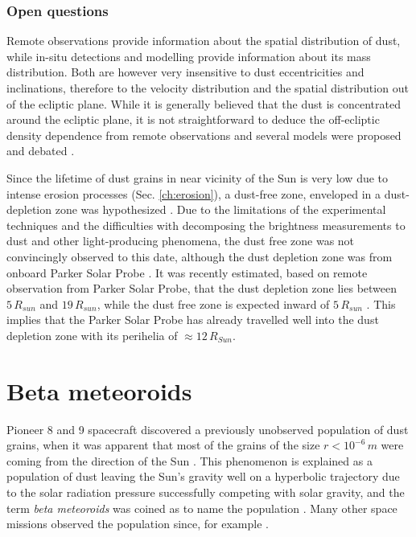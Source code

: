 \subsubsection{Open questions}

Remote observations provide information about the spatial distribution of dust, while in-situ detections and modelling provide information about its mass distribution. Both are however very insensitive to dust eccentricities and inclinations, therefore to the velocity distribution and the spatial distribution out of the ecliptic plane. While it is generally believed that the dust is concentrated around the ecliptic plane, it is not straightforward to deduce the off-ecliptic density dependence from remote observations and several models were proposed and debated \citep{giese1986three}.

Since the lifetime of dust grains in near vicinity of the Sun is very low due to intense erosion processes (Sec. \ref{ch:erosion}), a dust-free zone, enveloped in a dust-depletion zone was hypothesized \citep{russell1929meteoric}. Due to the limitations of the experimental techniques and the difficulties with decomposing the brightness measurements to dust and other light-producing phenomena, the dust free zone was not convincingly observed to this date, although the dust depletion zone was from onboard Parker Solar Probe \cite{stenborg2018characterization}. It was recently estimated, based on remote observation from Parker Solar Probe, that the dust depletion zone lies between $5 \, R_{sun}$ and $19 \, R_{sun}$, while the dust free zone is expected inward of $5 \, R_{sun}$ \citep{stenborg2022psp}. This implies that the Parker Solar Probe has already travelled well into the dust depletion zone with its perihelia of $\approx 12 \, R_{Sun}$.

\section{Beta meteoroids}

Pioneer 8 and 9 spacecraft discovered a previously unobserved population of dust grains, when it was apparent that most of the grains of the size $r < 10^{-6} \, \si{m}$ were coming from the direction of the Sun \cite{berg1973evidence}. This phenomenon is explained as a population of dust leaving the Sun's gravity well on a hyperbolic trajectory due to the solar radiation pressure successfully competing with solar gravity, and the term \textit{beta meteoroids} was coined as to name the population \cite{zook1975source}. Many other space missions observed the population since, for example \cite{zaslavsky2012interplanetary,malaspina2014interplanetary,zaslavsky2021first}.

